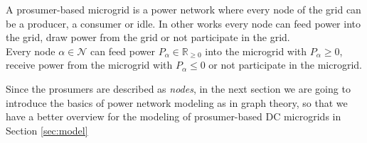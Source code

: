 \begin{definition}
\label{prosumer_def}
A prosumer-based microgrid is a power network where every node of the grid can be a producer, a consumer or idle. In other works every node can feed power into the grid, draw power from the grid or not participate in the grid.
\\Every node $\alpha \in \mathcal{N}$ can feed power $P_{\alpha} \in \mathbb{R}_{\geq 0}$ into the microgrid with $P_{\alpha} \geq 0 $, receive power from the microgrid with $P_{\alpha} \leq 0 $ or not participate in the microgrid.
\end{definition}
Since the prosumers are described as \textit{nodes}, in the next section we are going to introduce the basics of power network modeling as in graph theory, so that we have a better overview for the modeling of  prosumer-based DC microgrids in Section \ref{sec:model}
